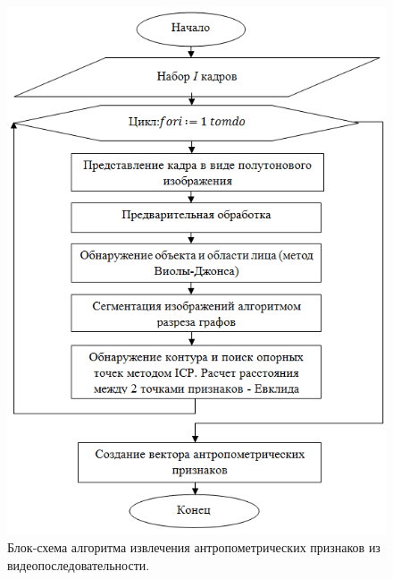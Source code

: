 \begin{figure}[ht!]
\centering
\includegraphics [scale=1.05] {images/h14.png}
\begin{center}
\caption{Блок-схема алгоритма извлечения антропометрических признаков из видеопоследовательности.} \label{img14}
\end{center}
\end{figure}